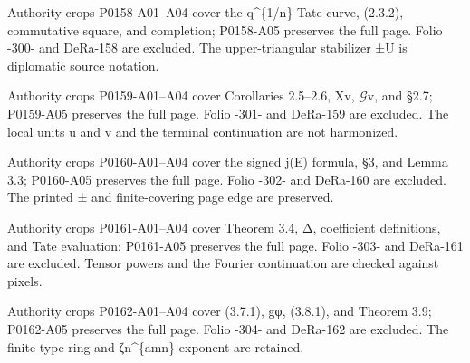 \documentclass[11pt,a4paper]{article}
\begin{document}
\par\medskip
\hypertarget{D018-P0158}{}
\par\smallskip
Authority crops P0158-A01--A04 cover the q\textasciicircum{}\{1/n\} Tate curve, (2.3.2), commutative square, and completion; P0158-A05 preserves the full page. Folio -300- and DeRa-158 are excluded. The upper-triangular stabilizer ±U is diplomatic source notation.


\par\medskip
\hypertarget{D018-P0159}{}
\par\smallskip
Authority crops P0159-A01--A04 cover Corollaries 2.5--2.6, X\textunderscore{}v, \ensuremath{\mathcal{G}}\textunderscore{}v, and §2.7; P0159-A05 preserves the full page. Folio -301- and DeRa-159 are excluded. The local units u and v and the terminal continuation are not harmonized.


\par\medskip
\hypertarget{D018-P0160}{}
\par\smallskip
Authority crops P0160-A01--A04 cover the signed j(E) formula, §3, and Lemma 3.3; P0160-A05 preserves the full page. Folio -302- and DeRa-160 are excluded. The printed ± and finite-covering page edge are preserved.


\par\medskip
\hypertarget{D018-P0161}{}
\par\smallskip
Authority crops P0161-A01--A04 cover Theorem 3.4, Δ, coefficient definitions, and Tate evaluation; P0161-A05 preserves the full page. Folio -303- and DeRa-161 are excluded. Tensor powers and the Fourier continuation are checked against pixels.


\par\medskip
\hypertarget{D018-P0162}{}
\par\smallskip
Authority crops P0162-A01--A04 cover (3.7.1), gφ, (3.8.1), and Theorem 3.9; P0162-A05 preserves the full page. Folio -304- and DeRa-162 are excluded. The finite-type ring and ζ\textunderscore{}n\textasciicircum{}\{amn\} exponent are retained.
\end{document}
